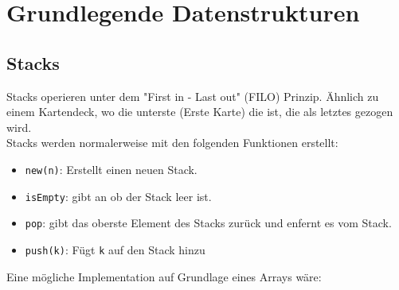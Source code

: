 \documentclass[
../AuD-Zusammenfassung.tex,
]
{subfiles}
\begin{document}
\section{Grundlegende Datenstrukturen}
\subsection{Stacks}
Stacks operieren unter dem "First in - Last out" (FILO) Prinzip. Ähnlich zu einem Kartendeck, wo die unterste (Erste Karte) die ist, die als letztes gezogen wird. \\
Stacks werden normalerweise mit den folgenden Funktionen erstellt:
\begin{itemize}
    \item \texttt{new(n)}: Erstellt einen neuen Stack.
    \item \texttt{isEmpty}: gibt an ob der Stack leer ist.
    \item \texttt{pop}: gibt das oberste Element des Stacks zurück und enfernt es vom Stack.
    \item \texttt{push(k)}: Fügt \texttt{k} auf den Stack hinzu
\end{itemize}
Eine mögliche Implementation auf Grundlage eines Arrays wäre:

\begin{algorithm}[H]
\end{algorithm}
\end{document}
